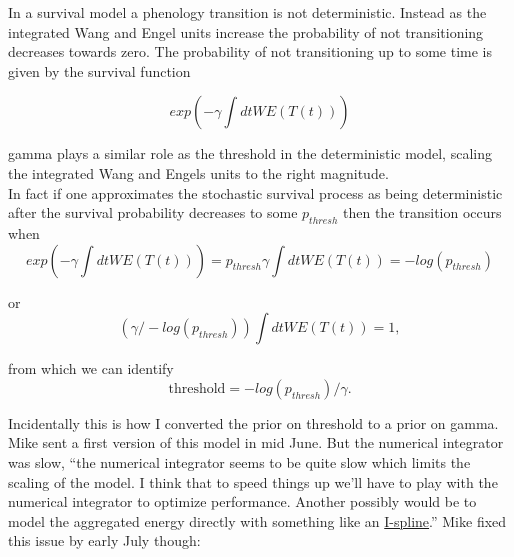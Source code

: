 \documentclass[11pt,letter]{article}
\begin{document}
In a survival model a phenology transition is not deterministic.  Instead as the 
integrated Wang and Engel units increase the probability of not transitioning 
decreases towards zero.  The probability of not transitioning up to some time
is given by the survival function

\begin{equation*}
exp( - \gamma \int dt WE(T(t) ))
\end{equation*}

gamma plays a similar role as the threshold in the deterministic model,
scaling the integrated Wang and Engels units to the right magnitude.\\

In fact if one approximates the stochastic survival process as being deterministic 
after the survival probability decreases to some $p_{thresh}$ then the transition
occurs when
\begin{equation*}
exp( - \gamma \int dt WE(T(t)) ) = p_{thresh}
\gamma \int dt WE(T(t))  = - log(p_{thresh})
\end{equation*}

or
\begin{equation*}
( \gamma / - log(p_{thresh}) ) \int dt WE(T(t)) = 1,
\end{equation*}

from which we can identify 
\begin{equation*}
\mbox{threshold} = - log(p_{thresh}) / \gamma.
\end{equation*}

Incidentally this is how I converted the prior on threshold to a prior on gamma.\\


Mike sent a first version of this model in mid June. But the numerical integrator was slow, ``the numerical integrator seems to be quite slow which limits the scaling of the model. I think that to speed things up we’ll have to play with the numerical integrator to  optimize performance.  Another possibly would be to model the aggregated energy directly with something like an \href{https://en.wikipedia.org/wiki/I-spline}{I-spline}.'' Mike fixed this issue by early July though:
\end{document}
